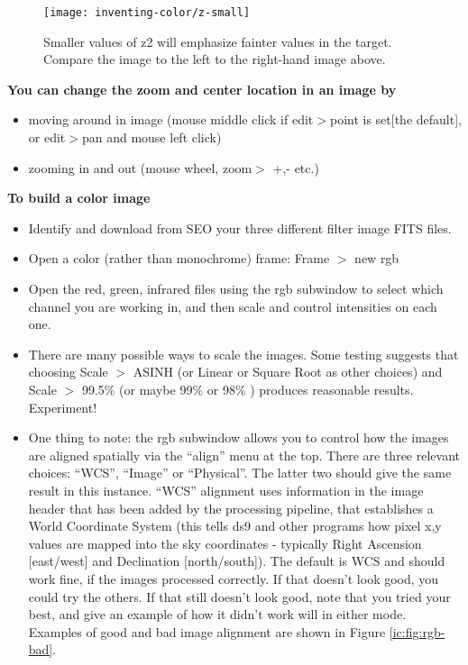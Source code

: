 \begin{figure}
\texttt{[image: inventing-color/z-small]}
\caption{Smaller values of z2 will emphasize fainter values in the target.
Compare the image to the left to the right-hand image
above.}
\label{ic:fig:z-small}
\end{figure}

\textbf{You can change the zoom and center location in an image by} 
\begin{itemize}
\item moving around in image (mouse middle click if edit$>$point is set[the default], or edit$>$pan and mouse left click)
\item zooming in and out (mouse wheel, zoom$>$ +,- etc.)
\end{itemize}

\textbf{To build a color image}
\begin{itemize}
\item Identify and download from SEO your three different filter image FITS
files.

\item Open a color (rather than monochrome) frame:  Frame $>$ new rgb

\item Open the red, green, infrared files using the rgb subwindow to select
which channel you are working in, and then scale and control intensities on
each one. 

\item There are many possible ways to scale the images. Some testing suggests
that choosing Scale $>$ ASINH (or Linear or Square Root as other choices) and
Scale $>$ 99.5\% (or maybe 99\% or 98\% )  produces reasonable results. Experiment!

\item One thing to note: the rgb subwindow allows you to control how the images
are aligned spatially via the “align” menu at the top. There are three relevant
choices: “WCS”, “Image” or “Physical”.  The latter two should give the same
result in this instance. “WCS” alignment uses information in the image header
that has been added by the processing pipeline, that establishes a World
Coordinate System (this tells ds9 and other programs how pixel x,y values are
mapped into the sky coordinates - typically Right Ascension [east/west] and
Declination [north/south]). The default is WCS and should work fine, if the
images processed correctly. If that doesn’t look good, you could try the
others. If that still doesn’t look good, note that you tried your best, and
give an example of how it didn’t work will in either mode. Examples of good and
bad image alignment are shown in Figure \ref{ic:fig:rgb-bad}.
\end{itemize}

